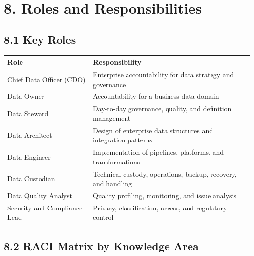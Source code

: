 \documentclass[
  letterpaper,
  DIV=11,
  numbers=noendperiod]{scrartcl}
\begin{document}
\section{8. Roles and
Responsibilities}\label{roles-and-responsibilities}

\subsection{8.1 Key Roles}\label{key-roles}

\begin{longtable}[]{@{}
  >{\raggedright\arraybackslash}p{}
  >{\raggedright\arraybackslash}p{}@{}}
\toprule\noalign{}
\begin{minipage}[b]{\linewidth}\raggedright
Role
\end{minipage} & \begin{minipage}[b]{\linewidth}\raggedright
Responsibility
\end{minipage} \\
\midrule\noalign{}
\endhead
\bottomrule\noalign{}
\endlastfoot
Chief Data Officer (CDO) & Enterprise accountability for data strategy
and governance \\
Data Owner & Accountability for a business data domain \\
Data Steward & Day-to-day governance, quality, and definition
management \\
Data Architect & Design of enterprise data structures and integration
patterns \\
Data Engineer & Implementation of pipelines, platforms, and
transformations \\
Data Custodian & Technical custody, operations, backup, recovery, and
handling \\
Data Quality Analyst & Quality profiling, monitoring, and issue
analysis \\
Security and Compliance Lead & Privacy, classification, access, and
regulatory control \\
\end{longtable}

\subsection{8.2 RACI Matrix by Knowledge
Area}\label{raci-matrix-by-knowledge-area}
\end{document}
